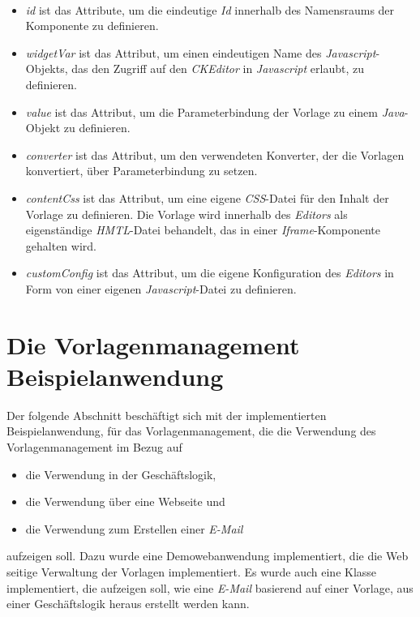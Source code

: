 \ \begin{itemize}
	\item\emph{id} ist das Attribute, um die eindeutige \emph{Id} innerhalb des Namensraums der Komponente zu definieren.
	\item\emph{widgetVar} ist das Attribut, um einen eindeutigen Name des \emph{Javascript}-Objekts, das den Zugriff auf den \emph{CKEditor} in \emph{Javascript} erlaubt, zu definieren.
	\item\emph{value} ist das Attribut, um die Parameterbindung der Vorlage zu einem \emph{Java}-Objekt zu definieren.
	\item\emph{converter} ist das Attribut, um den verwendeten Konverter, der die Vorlagen konvertiert, über Parameterbindung zu setzen.
	\item\emph{contentCss} ist das Attribut, um eine eigene \emph{CSS}-Datei für den Inhalt der Vorlage zu definieren. Die Vorlage wird innerhalb des \emph{Editors} als eigenständige \emph{HMTL}-Datei behandelt, das in einer \emph{Iframe}-Komponente gehalten wird.
	\item\emph{customConfig} ist das Attribut, um die eigene Konfiguration des \emph{Editors} in Form von einer eigenen \emph{Javascript}-Datei zu definieren. 
\end{itemize}

\section{Die Vorlagenmanagement Beispielanwendung}
Der folgende Abschnitt beschäftigt sich mit der implementierten Beispielanwendung, für das Vorlagenmanagement, die die Verwendung des Vorlagenmanagement im Bezug auf 
\begin{itemize}
	\item die Verwendung in der Geschäftslogik,
	\item die Verwendung über eine Webseite und
	\item die Verwendung zum Erstellen einer \emph{E-Mail}  
\end{itemize}
aufzeigen soll. Dazu wurde eine Demowebanwendung implementiert, die die Web seitige  Verwaltung der Vorlagen implementiert. Es wurde auch eine Klasse implementiert, die aufzeigen soll, wie eine \emph{E-Mail} basierend auf einer Vorlage, aus einer Geschäftslogik heraus erstellt werden kann. 

